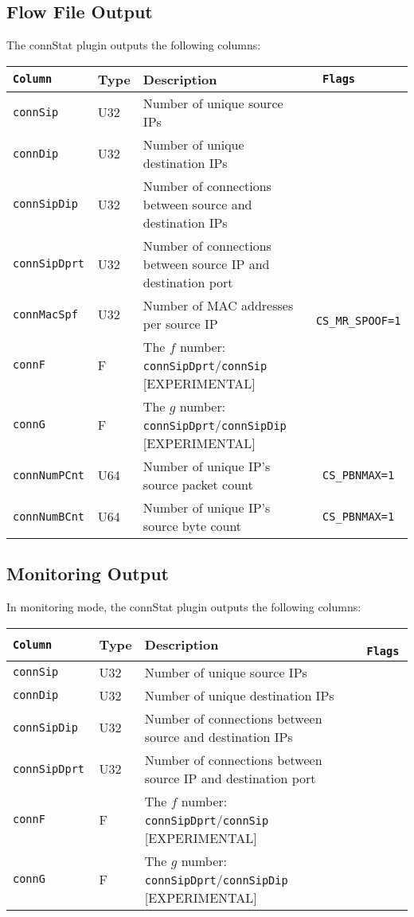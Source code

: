 \documentclass[documentation]{subfiles}
\begin{document}
\subsection{Flow File Output}
The connStat plugin outputs the following columns:
\begin{longtable}{>{\tt}lll>{\tt\small}l}
    \toprule
    {\bf Column} & {\bf Type} & {\bf Description} & {\bf Flags}\\
    \midrule\endhead%
    connSip     & U32 & Number of unique source IPs                                       & \\
    connDip     & U32 & Number of unique destination IPs                                  & \\
    connSipDip  & U32 & Number of connections between source and destination IPs          & \\
    connSipDprt & U32 & Number of connections between source IP and destination port      & \\
    connMacSpf  & U32 & Number of MAC addresses per source IP                             & CS\_MR\_SPOOF=1\\
    connF       &   F & The $f$ number: {\tt connSipDprt}/{\tt connSip} [EXPERIMENTAL]    & \\
    connG       &   F & The $g$ number: {\tt connSipDprt}/{\tt connSipDip} [EXPERIMENTAL] & \\
    connNumPCnt & U64 & Number of unique IP's source packet count                         & CS\_PBNMAX=1\\
    connNumBCnt & U64 & Number of unique IP's source byte count                           & CS\_PBNMAX=1\\
    \bottomrule
\end{longtable}

\subsection{Monitoring Output}
In monitoring mode, the connStat plugin outputs the following columns:
\begin{longtable}{>{\tt}lll>{\tt\small}l}
    \toprule
    {\bf Column} & {\bf Type} & {\bf Description} & {\bf Flags}\\
    \midrule\endhead%
    connSip     & U32 & Number of unique source IPs                                       & \\
    connDip     & U32 & Number of unique destination IPs                                  & \\
    connSipDip  & U32 & Number of connections between source and destination IPs          & \\
    connSipDprt & U32 & Number of connections between source IP and destination port      & \\
    connF       &   F & The $f$ number: {\tt connSipDprt}/{\tt connSip} [EXPERIMENTAL]    & \\
    connG       &   F & The $g$ number: {\tt connSipDprt}/{\tt connSipDip} [EXPERIMENTAL] & \\
    \bottomrule
\end{longtable}
\end{document}
